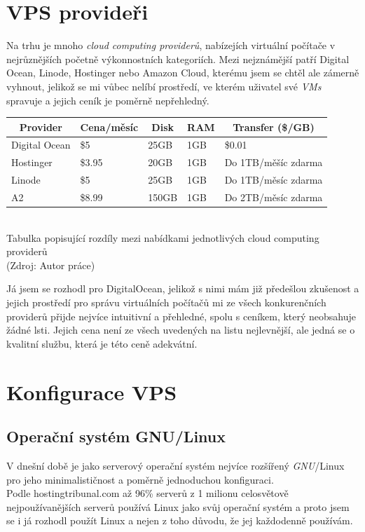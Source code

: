 \documentclass[12pt,a4paper]{report}
\begin{document}
  \section{VPS provideři}
  Na trhu je mnoho \emph{cloud computing providerů}, nabízejích virtuální počítače
  v nejrůznějších početně výkonnostních kategoriích. Mezi nejznámější patří Digital Ocean,
  Linode, Hostinger nebo Amazon Cloud, kterému jsem se chtěl ale zámerně vyhnout, jelikož se mi vůbec nelíbí 
  prostředí, ve kterém uživatel své \emph{VMs} spravuje a jejich ceník je poměrně nepřehledný.
  \begin{center}
    \noindent\begin{tabular}{|l|l|l|l|l|}
      \multicolumn{1}{c}{\bfseries Provider} & \multicolumn{1}{c}{\bfseries Cena/měsíc} & \multicolumn{1}{c}{\bfseries Disk} & \multicolumn{1}{c}{\bfseries RAM} & \multicolumn{1}{c}{\bfseries Transfer (\$/GB)} \\ \hline
      Digital Ocean & \$5 & 25GB & 1GB & \$0.01 \\ \hline
      Hostinger & \$3.95 & 20GB & 1GB & Do 1TB/měšíc zdarma \\ \hline
      Linode & \$5 & 25GB & 1GB & Do 1TB/měsíc zdarma \\ \hline
      A2 & \$8.99 & 150GB & 1GB & Do 2TB/měsíc zdarma \\ \hline
    \end{tabular}\\
    \vspace{0.5cm}
    Tabulka popisující rozdíly mezi nabídkami jednotlivých cloud computing providerů  \\
    (Zdroj: Autor práce)
  \end{center}
  Já jsem se rozhodl pro DigitalOcean, jelikož s nimi mám již předešlou 
  zkušenost a jejich prostředí pro správu virtuálních počítačů mi ze všech 
  konkurenčních providerů přijde nejvíce intuitivní a přehledné, spolu s ceníkem, 
  který neobsahuje žádné lsti. Jejich cena není ze všech uvedených na listu nejlevnější,
  ale jedná se o kvalitní službu, která je této ceně adekvátní.  
  \section{Konfigurace VPS}
  \subsection{Operační systém GNU/Linux}
  V dnešní době je jako serverový operační systém nejvíce rozšířený \emph{GNU}/Linux pro jeho
  minimalističnost a poměrně jednoduchou konfiguraci.\\ Podle hostingtribunal.com až 96\% serverů z
  1 milionu celosvětově nejpoužívanějších serverů používá Linux jako svůj operační systém a proto
  jsem se i já rozhodl použít Linux a nejen z toho důvodu, že jej každodenně používám.
\end{document}
